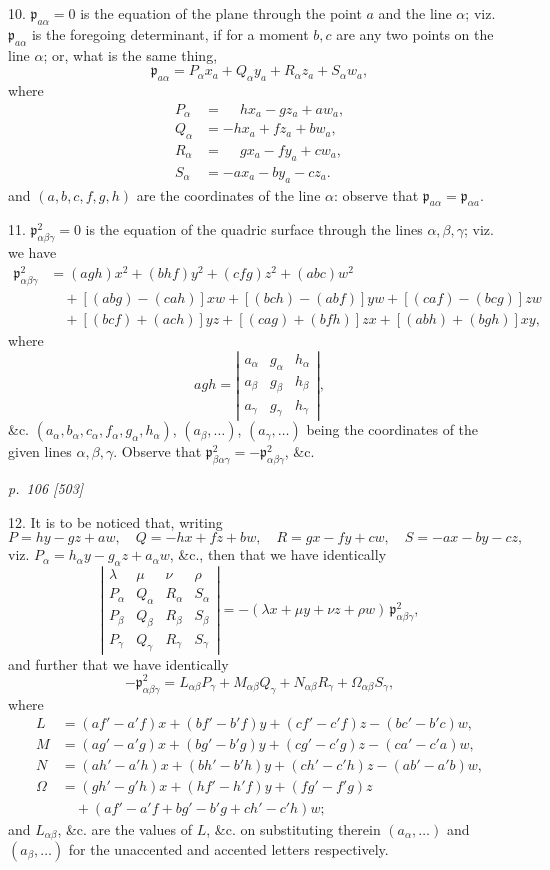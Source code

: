 \documentclass[11pt,a4paper]{article}
\newcommand{\sourcepage}[2]{%
  \bigskip
  \noindent\textit{p.~#1 [#2]}%
  \par\smallskip
}
\newcommand{\Det}[1]{\left|\begin{matrix}#1\end{matrix}\right|}
\newcommand{\p}{\mathfrak p}
\begin{document}
10. $\p_{a\alpha}=0$ is the equation of the plane through the point $a$ and the
line $\alpha$; viz. $\p_{a\alpha}$ is the foregoing determinant, if for a moment
$b,c$ are any two points on the line $\alpha$; or, what is the same thing,
\[
\p_{a\alpha}=P_\alpha x_a+Q_\alpha y_a+R_\alpha z_a+S_\alpha w_a,
\]
where
\[
\begin{aligned}
P_\alpha&=\phantom{-}h x_a-g z_a+a w_a,\\
Q_\alpha&=-h x_a+f z_a+b w_a,\\
R_\alpha&=\phantom{-}g x_a-f y_a+c w_a,\\
S_\alpha&=-a x_a-b y_a-c z_a.
\end{aligned}
\]
and $(a,b,c,f,g,h)$ are the coordinates of the line $\alpha$: observe that
$\p_{a\alpha}=\p_{\alpha a}$.

11. $\p^2_{\alpha\beta\gamma}=0$ is the equation of the quadric surface through
the lines $\alpha,\beta,\gamma$; viz. we have
\[
\begin{aligned}
\p^2_{\alpha\beta\gamma}
&=(agh)x^2+(bhf)y^2+(cfg)z^2+(abc)w^2\\
&\quad+[(abg)-(cah)]xw+[(bch)-(abf)]yw+[(caf)-(bcg)]zw\\
&\quad+[(bcf)+(ach)]yz+[(cag)+(bfh)]zx+[(abh)+(bgh)]xy,
\end{aligned}
\]
where
\[
agh=\Det{a_\alpha&g_\alpha&h_\alpha\\
a_\beta&g_\beta&h_\beta\\
a_\gamma&g_\gamma&h_\gamma},
\]
\&c. $(a_\alpha,b_\alpha,c_\alpha,f_\alpha,g_\alpha,h_\alpha)$,
$(a_\beta,\ldots)$, $(a_\gamma,\ldots)$ being the coordinates of the given lines
$\alpha,\beta,\gamma$. Observe that
$\p^2_{\beta\alpha\gamma}=-\p^2_{\alpha\beta\gamma}$, \&c.

\sourcepage{106}{503}
12. It is to be noticed that, writing
\[
P=hy-gz+aw,\quad Q=-hx+fz+bw,\quad R=gx-fy+cw,\quad S=-ax-by-cz,
\]
viz. $P_\alpha=h_\alpha y-g_\alpha z+a_\alpha w$, \&c., then that we have identically
\[
\Det{
\lambda&\mu&\nu&\rho\\
P_\alpha&Q_\alpha&R_\alpha&S_\alpha\\
P_\beta&Q_\beta&R_\beta&S_\beta\\
P_\gamma&Q_\gamma&R_\gamma&S_\gamma}
=-(\lambda x+\mu y+\nu z+\rho w)\,\p^2_{\alpha\beta\gamma},
\]
and further that we have identically
\[
-\p^2_{\alpha\beta\gamma}
=L_{\alpha\beta}P_\gamma+M_{\alpha\beta}Q_\gamma
+N_{\alpha\beta}R_\gamma+\Omega_{\alpha\beta}S_\gamma,
\]
where
\[
\begin{aligned}
L&=(af'-a'f)x+(bf'-b'f)y+(cf'-c'f)z-(bc'-b'c)w,\\
M&=(ag'-a'g)x+(bg'-b'g)y+(cg'-c'g)z-(ca'-c'a)w,\\
N&=(ah'-a'h)x+(bh'-b'h)y+(ch'-c'h)z-(ab'-a'b)w,\\
\Omega&=(gh'-g'h)x+(hf'-h'f)y+(fg'-f'g)z\\
&\quad+(af'-a'f+bg'-b'g+ch'-c'h)w;
\end{aligned}
\]
and $L_{\alpha\beta}$, \&c. are the values of $L$, \&c. on substituting therein
$(a_\alpha,\ldots)$ and $(a_\beta,\ldots)$ for the unaccented and accented letters
respectively.
\end{document}
